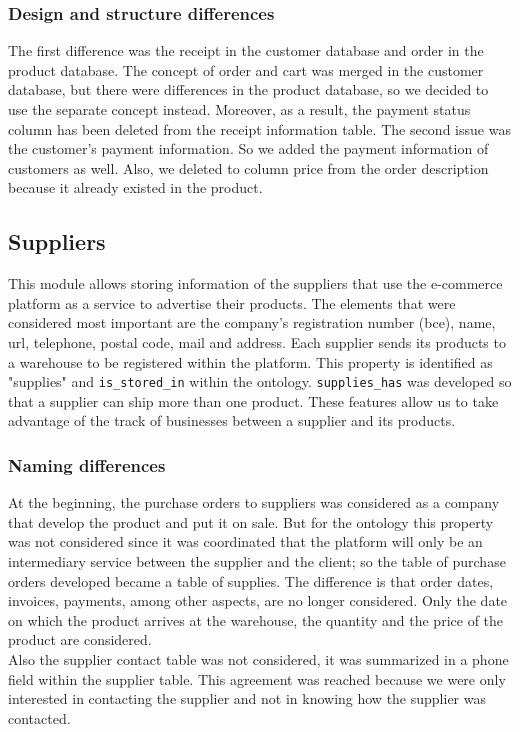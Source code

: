 \documentclass{article}
\begin{document}
\subsubsection{Design and structure differences}
The first difference was the receipt in the customer database and order in the product database. The concept of order and cart was merged in the customer database, but there were differences in the product database, so we decided to use the separate concept instead. Moreover, as a result, the payment status column has been deleted from the receipt information table. The second issue was the customer's payment information. So we added the payment information of customers as well. Also, we deleted to column price from the order description because it already existed in the product.


\subsection{Suppliers}
This module allows storing information of the suppliers that use the e-commerce platform as a service to advertise their products. The elements that were considered most important are the company's registration number (bce), name, url, telephone, postal code, mail and address. Each supplier sends its products to a warehouse to be registered within the platform. This property is identified as "supplies" and \texttt{is\_stored\_in} within the ontology. \texttt{supplies\_has} was developed so that a supplier can ship more than one product. These features allow us to take advantage of the track of businesses between a supplier and its products.
\subsubsection{Naming differences}
At the beginning, the purchase orders to suppliers was considered as a company that develop the product and put it on sale. But for the ontology this property was not considered since it was coordinated that the platform will only be an intermediary service between the supplier and the client; so the table of purchase orders developed became a table of supplies. The difference is that order dates, invoices, payments, among other aspects, are no longer considered. Only the date on which the product arrives at the warehouse, the quantity and the price of the product are considered. \\

Also the supplier contact table was not considered, it was summarized in a phone field within the supplier table. This agreement was reached because we were only interested in contacting the supplier and not in knowing how the supplier was contacted.
\end{document}
